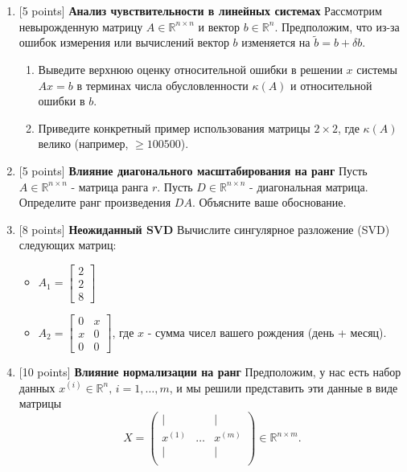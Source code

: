 \documentclass[
  russian,
  letterpaper,
  DIV=11,
  numbers=noendperiod]{scrartcl}
\providecommand{\tightlist}{%
  \setlength{\itemsep}{0pt}\setlength{\parskip}{0pt}}
\begin{document}
\begin{enumerate}
\def\labelenumi{\arabic{enumi}.}
\item
  {[}5 points{]} \textbf{Анализ чувствительности в линейных системах}
  Рассмотрим невырожденную матрицу \(A \in \mathbb{R}^{n \times n}\) и
  вектор \(b \in \mathbb{R}^n\). Предположим, что из-за ошибок измерения
  или вычислений вектор \(b\) изменяется на
  \(\tilde{b} = b + \delta b\).

  \begin{enumerate}
  \def\labelenumii{\arabic{enumii}.}
  \tightlist
  \item
    Выведите верхнюю оценку относительной ошибки в решении \(x\) системы
    \(Ax = b\) в терминах числа обусловленности \(\kappa(A)\) и
    относительной ошибки в \(b\).\\
  \item
    Приведите конкретный пример использования матрицы \(2 \times 2\),
    где \(\kappa(A)\) велико (например, \(\geq 100500\)).
  \end{enumerate}
\item
  {[}5 points{]} \textbf{Влияние диагонального масштабирования на ранг}
  Пусть \(A \in \mathbb{R}^{n \times n}\) - матрица ранга \(r\). Пусть
  \(D \in \mathbb{R}^{n \times n}\) - диагональная матрица. Определите
  ранг произведения \(DA\). Объясните ваше обоснование.
\item
  {[}8 points{]} \textbf{Неожиданный SVD} Вычислите сингулярное
  разложение (SVD) следующих матриц:

  \begin{itemize}
  \tightlist
  \item
    \(A_1 = \begin{bmatrix} 2 \\ 2 \\ 8 \end{bmatrix}\)
  \item
    \(A_2 = \begin{bmatrix} 0 & x \\ x & 0 \\ 0 & 0 \end{bmatrix}\), где
    \(x\) - сумма чисел вашего рождения (день + месяц).
  \end{itemize}
\item
  {[}10 points{]} \textbf{Влияние нормализации на ранг} Предположим, у
  нас есть набор данных \(x^{(i)}\in\mathbb{R}^{n},\,i=1,\dots,m\), и мы
  решили представить эти данные в виде матрицы \[
   X =
   \begin{pmatrix}
    | & & | \\
    x^{(1)} & \dots & x^{(m)} \\
    | & & | \\
   \end{pmatrix} \in \mathbb{R}^{n \times m}.
   \]


\end{enumerate}
\end{document}
